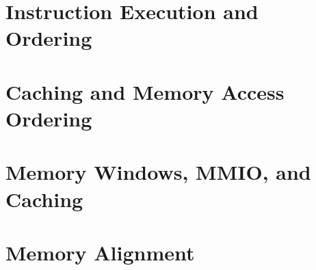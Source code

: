 \section{Instruction Execution and Ordering}
\label{sec:cpu:Instruction Execution and Ordering}

\section{Caching and Memory Access Ordering}
\label{sec:cpu:Caching and Memory Access Ordering}

\section{Memory Windows, MMIO, and Caching}
\label{sec:cpu:Memory Windows, MMIO, and Caching}

\section{Memory Alignment}
\label{sec:cpu:Memory Alignment}
